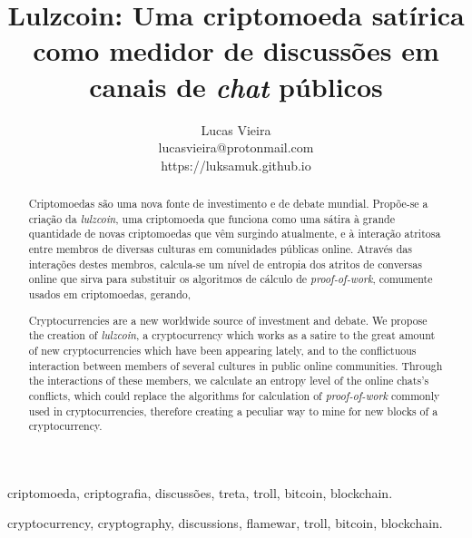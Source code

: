 \documentclass[conference]{IEEEtran}
\begin{document}

\title{Lulzcoin: Uma criptomoeda satírica como medidor de discussões em canais de \textit{chat} públicos}
\author{Lucas Vieira\\lucasvieira@protonmail.com\\https://luksamuk.github.io}


\maketitle


\begin{abstract}
Criptomoedas são uma nova fonte de investimento e de debate mundial. Propõe-se a criação da \textit{lulzcoin}, uma criptomoeda que funciona como uma sátira à grande quantidade de novas criptomoedas que vêm surgindo atualmente, e à interação atritosa entre membros de diversas culturas em comunidades públicas online. Através das interações destes membros, calcula-se um nível de entropia dos atritos de conversas online que sirva para substituir os algoritmos de cálculo de \textit{proof-of-work}, comumente usados em criptomoedas, gerando,
\end{abstract}
\begin{IEEEkeywords}
criptomoeda, criptografia, discussões, treta, troll, bitcoin, blockchain.
\end{IEEEkeywords}

\begin{abstract}
Cryptocurrencies are a new worldwide source of investment and debate. We propose the creation of \textit{lulzcoin}, a cryptocurrency which works as a satire to the great amount of new cryptocurrencies which have been appearing lately, and to the conflictuous interaction between members of several cultures in public online communities. Through the interactions of these members, we calculate an entropy level of the online chats's conflicts, which could replace the algorithms for calculation of \textit{proof-of-work} commonly used in cryptocurrencies, therefore creating a peculiar way to mine for new blocks of a cryptocurrency.
\end{abstract}
\begin{IEEEkeywords}
cryptocurrency, cryptography, discussions, flamewar, troll, bitcoin, blockchain.
\end{IEEEkeywords}
\end{document}
